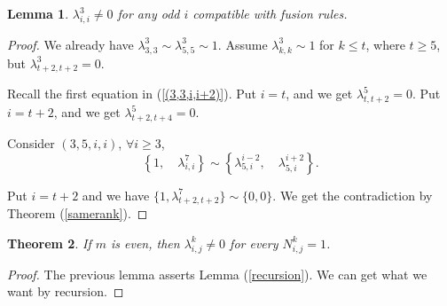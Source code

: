 \documentclass{article}
\newtheorem{lemma}{Lemma}[section]
\newtheorem{theorem}[lemma]{Theorem}
\begin{document}





\begin{lemma}
$\lambda_{i,i}^3\neq 0$ for any odd $i$ compatible with fusion rules.
\end{lemma}
\begin{proof}
We already have $\lambda_{3,3}^3\sim\lambda_{5,5}^3\sim 1$.
Assume $\lambda_{k,k}^3\sim 1$ for $k\leq t$, where $t\geq 5$, but $\lambda_{t+2,t+2}^3=0$.

Recall the first equation in (\ref{(3,3,i,i+2)}).
Put $i=t$, and we get $\lambda_{t,t+2}^5=0$.
Put $i=t+2$, and we get $\lambda_{t+2,t+4}^5=0$.


Consider $(3,5,i,i)$, $\forall i\geq 3$,
$$\left\{1,\quad
\lambda_{i,i}^7\right\}
\sim
\left\{\lambda_{5,i}^{i-2},\quad
\lambda_{5,i}^{i+2}\right\}.
$$   


Put $i=t+2$ and we have
$\{1,\lambda_{t+2,t+2}^7\}\sim\{0,0\}.$
We get the contradiction by Theorem (\ref{samerank}).
\end{proof}

\begin{theorem}
If $m$ is even, then $\lambda_{i,j}^k\neq 0$ for every $N_{i,j}^k =1$.
\end{theorem}
\begin{proof}
The previous lemma asserts Lemma (\ref{recursion}). 
We can get what we want by recursion.
\end{proof}
\end{document}
